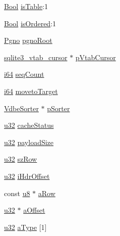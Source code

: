 \begin{DoxyCompactItemize}
\item 
\hyperlink{sqlite3_8c_a2f520588d7cfd47c237231e103dbeb78}{Bool} \hyperlink{struct_vdbe_cursor_a6ab8dc1239f77f0296812916d43e973e}{is\+Table}\+:1
\item 
\hyperlink{sqlite3_8c_a2f520588d7cfd47c237231e103dbeb78}{Bool} \hyperlink{struct_vdbe_cursor_af467d3110dfc862dd5481f487ae62af6}{is\+Ordered}\+:1
\item 
\hyperlink{sqlite3_8c_aec0c653e8dd16e4639caf2f8ea54f55c}{Pgno} \hyperlink{struct_vdbe_cursor_a30f00f9ff785feab4d71f2cf58faab84}{pgno\+Root}
\item 
\hyperlink{structsqlite3__vtab__cursor}{sqlite3\+\_\+vtab\+\_\+cursor} $\ast$ \hyperlink{struct_vdbe_cursor_ade9003fb9468196e8abfee21c6e4b914}{p\+Vtab\+Cursor}
\item 
\hyperlink{sqlite3_8c_a2a0f0f4ae7001eb54351f77ea1cdbcfd}{i64} \hyperlink{struct_vdbe_cursor_abd2178c8ecc4c97494f90c4766b928f7}{seq\+Count}
\item 
\hyperlink{sqlite3_8c_a2a0f0f4ae7001eb54351f77ea1cdbcfd}{i64} \hyperlink{struct_vdbe_cursor_a0684b330a73a8653f256e762327cb99b}{moveto\+Target}
\item 
\hyperlink{struct_vdbe_sorter}{Vdbe\+Sorter} $\ast$ \hyperlink{struct_vdbe_cursor_a4be97d7a48d4328b3f5339ebf2d6aa25}{p\+Sorter}
\item 
\hyperlink{sqlite3_8c_a03ad5adfaeb9b7640dde78a0cc390319}{u32} \hyperlink{struct_vdbe_cursor_a07253ca07568b4f1be1fe2709deb6e16}{cache\+Status}
\item 
\hyperlink{sqlite3_8c_a03ad5adfaeb9b7640dde78a0cc390319}{u32} \hyperlink{struct_vdbe_cursor_a054d7cfc97910464363686b382c5f02a}{payload\+Size}
\item 
\hyperlink{sqlite3_8c_a03ad5adfaeb9b7640dde78a0cc390319}{u32} \hyperlink{struct_vdbe_cursor_a123e55d76daa31b2adbdc8a3ac10cd62}{sz\+Row}
\item 
\hyperlink{sqlite3_8c_a03ad5adfaeb9b7640dde78a0cc390319}{u32} \hyperlink{struct_vdbe_cursor_a6275a07eb80f66cc8da6503608c61111}{i\+Hdr\+Offset}
\item 
const \hyperlink{sqlite3_8c_a74a0f6424ae628af25f23f0a35f6ead3}{u8} $\ast$ \hyperlink{struct_vdbe_cursor_a2fb89d269dbeccde95fe67e8043782ba}{a\+Row}
\item 
\hyperlink{sqlite3_8c_a03ad5adfaeb9b7640dde78a0cc390319}{u32} $\ast$ \hyperlink{struct_vdbe_cursor_a413b8730948be78e2f36c35f6ae453e1}{a\+Offset}
\item 
\hyperlink{sqlite3_8c_a03ad5adfaeb9b7640dde78a0cc390319}{u32} \hyperlink{struct_vdbe_cursor_ac9a3d92f6e20d945ec2b55b1402455ba}{a\+Type} \mbox{[}1\mbox{]}
\end{DoxyCompactItemize}



